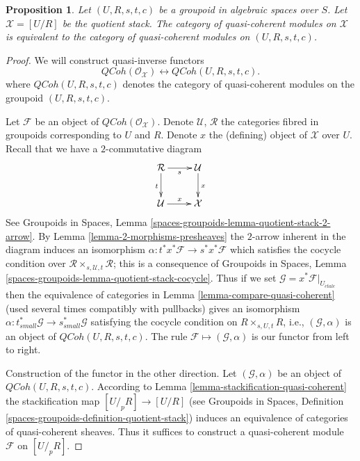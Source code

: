 \documentclass{stacks-project}
\theoremstyle{plain}
\newtheorem{proposition}[subsection]{Proposition}
\theoremstyle{definition}
\theoremstyle{remark}
\numberwithin{equation}{subsection}
\def\etale{{\acute{e}tale}}
\def\QCoh{\mathit{QCoh}}
\begin{document}
\begin{proposition}
\label{proposition-quasi-coherent}
Let $(U, R, s, t, c)$ be a groupoid in algebraic spaces over $S$.
Let $\mathcal{X} = [U/R]$ be the quotient stack.
The category of quasi-coherent modules on $\mathcal{X}$
is equivalent to the category of quasi-coherent modules
on $(U, R, s, t, c)$.
\end{proposition}

\begin{proof}
We will construct quasi-inverse functors
$$
\QCoh(\mathcal{O}_\mathcal{X})
\longleftrightarrow
\QCoh(U, R, s, t, c).
$$
where $\QCoh(U, R, s, t, c)$ denotes the category of quasi-coherent modules
on the groupoid $(U, R, s, t, c)$.

\medskip\noindent
Let $\mathcal{F}$ be an object of $\QCoh(\mathcal{O}_\mathcal{X})$.
Denote $\mathcal{U}$, $\mathcal{R}$ the categories fibred in groupoids
corresponding to $U$ and $R$. Denote $x$ the (defining) object of $\mathcal{X}$
over $U$. Recall that we have a $2$-commutative diagram
$$
\xymatrix{
\mathcal{R} \ar[r]_s \ar[d]_t & \mathcal{U} \ar[d]^x \\
\mathcal{U} \ar[r]^x & \mathcal{X}
}
$$
See Groupoids in Spaces, Lemma
\ref{spaces-groupoids-lemma-quotient-stack-2-arrow}.
By Lemma \ref{lemma-2-morphisms-presheaves}
the $2$-arrow inherent in the diagram induces an isomorphism
$\alpha : t^*x^*\mathcal{F} \to s^*x^*\mathcal{F}$
which satisfies the cocycle condition over
$\mathcal{R} \times_{s, \mathcal{U}, t} \mathcal{R}$;
this is a consequence of Groupoids in Spaces, Lemma
\ref{spaces-groupoids-lemma-quotient-stack-cocycle}.
Thus if we set $\mathcal{G} = x^*\mathcal{F}|_{U_\etale}$
then the equivalence of categories in
Lemma \ref{lemma-compare-quasi-coherent}
(used several times compatibly with pullbacks)
gives an isomorphism
$\alpha : t_{small}^*\mathcal{G} \to s_{small}^*\mathcal{G}$
satisfying the cocycle condition on $R \times_{s, U, t} R$, i.e.,
$(\mathcal{G}, \alpha)$ is an object of $\QCoh(U, R, s, t, c)$.
The rule $\mathcal{F} \mapsto (\mathcal{G}, \alpha)$ is our
functor from left to right.

\medskip\noindent
Construction of the functor in the other direction.
Let $(\mathcal{G}, \alpha)$ be an object of $\QCoh(U, R, s, t, c)$.
According to Lemma \ref{lemma-stackification-quasi-coherent}
the stackification map $[U/_{\!p}R] \to [U/R]$ (see
Groupoids in Spaces, Definition
\ref{spaces-groupoids-definition-quotient-stack})
induces an equivalence of categories of quasi-coherent sheaves.
Thus it suffices to construct a quasi-coherent module $\mathcal{F}$
on $[U/_{\!p}R]$.


\end{proof}
\end{document}
